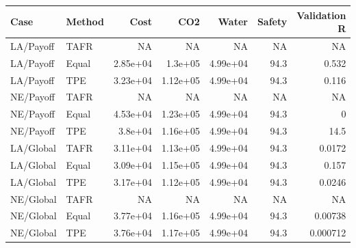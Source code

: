 \begin{tabular}{llrrrrr}
\toprule
Case & Method & Cost & CO2 & Water & Safety & Validation R \\
\midrule
LA/Payoff & TAFR & NA & NA & NA & NA & NA \\
LA/Payoff & Equal & 2.85e+04 & 1.3e+05 & 4.99e+04 & 94.3 & 0.532 \\
LA/Payoff & TPE & 3.23e+04 & 1.12e+05 & 4.99e+04 & 94.3 & 0.116 \\
NE/Payoff & TAFR & NA & NA & NA & NA & NA \\
NE/Payoff & Equal & 4.53e+04 & 1.23e+05 & 4.99e+04 & 94.3 & 0 \\
NE/Payoff & TPE & 3.8e+04 & 1.16e+05 & 4.99e+04 & 94.3 & 14.5 \\
LA/Global & TAFR & 3.11e+04 & 1.13e+05 & 4.99e+04 & 94.3 & 0.0172 \\
LA/Global & Equal & 3.09e+04 & 1.15e+05 & 4.99e+04 & 94.3 & 0.157 \\
LA/Global & TPE & 3.17e+04 & 1.12e+05 & 4.99e+04 & 94.3 & 0.0246 \\
NE/Global & TAFR & NA & NA & NA & NA & NA \\
NE/Global & Equal & 3.77e+04 & 1.16e+05 & 4.99e+04 & 94.3 & 0.00738 \\
NE/Global & TPE & 3.76e+04 & 1.17e+05 & 4.99e+04 & 94.3 & 0.000712 \\
\bottomrule
\end{tabular}
